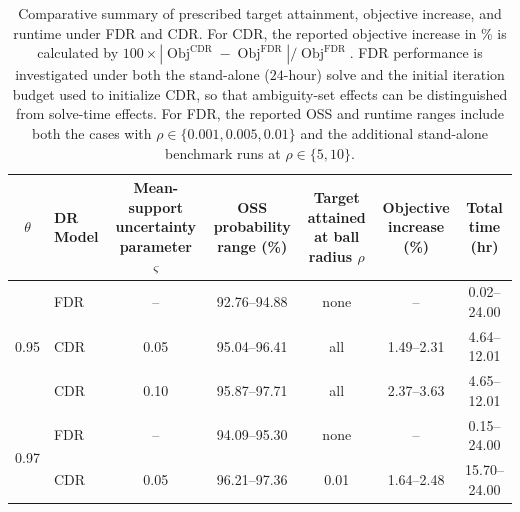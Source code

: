 \documentclass[opre,sglanonrev]{informs4}
\begin{document}
\begin{table}[!hbtp]
\centering
\caption{Comparative summary of prescribed target attainment, objective increase, and runtime under FDR and CDR. For CDR, the reported objective increase in \% is calculated by $100 \times |\operatorname{Obj}^{\mathrm{CDR}}-\operatorname{Obj}^{\mathrm{FDR}}|/\operatorname{Obj}^{\mathrm{FDR}}$. FDR performance is investigated under both the stand-alone (\(24\)-hour) solve and the initial iteration budget used to initialize CDR, so that ambiguity-set effects can be distinguished from solve-time effects. For FDR, the reported OSS and runtime ranges include both the cases with $\rho \in \{0.001,0.005,0.01\}$ and the additional stand-alone benchmark runs at $\rho \in \{5,10\}$. %
}
\label{tab:compact_target_summary}
\setlength{\tabcolsep}{4.5pt}
\renewcommand{\arraystretch}{1.05}
\scriptsize
\begin{tabular}{c l c c c c c}
\toprule
 \(\theta\) & \makecell{DR \\ Model} & \makecell{Mean-support \\ uncertainty \\ parameter \(\varsigma\)} & \makecell{OSS probability \\ range (\%)} & \makecell{Target attained at \\ ball radius \(\rho\)} & \makecell{Objective \\ increase (\%)} & Total time (hr) \\
\midrule
\multirow{3}{*}{0.95}
& FDR & -- & 92.76--94.88 & none & -- & 0.02--24.00 \\
& CDR & 0.05 & 95.04--96.41 & all & 1.49--2.31 & 4.64--12.01 \\
& CDR & 0.10 & 95.87--97.71 & all & 2.37--3.63 & 4.65--12.01 \\
\midrule
\multirow{3}{*}{0.97}
& FDR & -- & 94.09--95.30 & none & -- & 0.15--24.00 \\
& CDR & 0.05 & 96.21--97.36 & 0.01 & 1.64--2.48 & 15.70--24.00 \\

\end{tabular}
\end{table}
\end{document}
